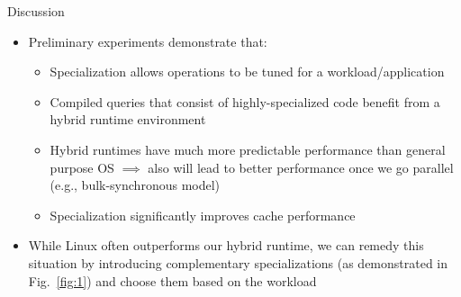 \begin{block}{Discussion}

  \begin{itemize}
  \item Preliminary experiments demonstrate that:
    \begin{itemize}
    \item Specialization allows operations to be tuned for a workload/application
    \item Compiled queries that consist of highly-specialized code benefit from a hybrid runtime environment
    \item Hybrid runtimes have much more predictable performance than general purpose OS $\implies$ also will lead to better performance once we go parallel (e.g., bulk-synchronous model)
    \item Specialization significantly improves cache performance 
    \end{itemize}
  \item While Linux often outperforms our hybrid runtime, we can remedy this situation by introducing complementary specializations (as demonstrated in Fig.~\ref{fig:1}) and choose them based on the workload
  \end{itemize}


\end{block}
